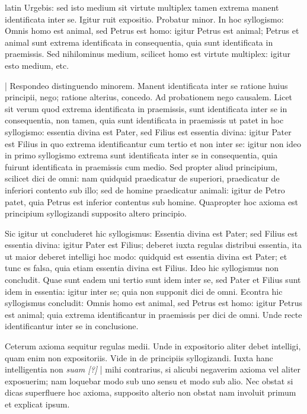 \begin{otherlanguage*}{latin}
\pstart
Urgebis:
sed isto medium sit virtute multiplex tamen extrema manent identificata inter se. Igitur ruit expositio. Probatur minor. In hoc syllogismo:
Omnis homo est animal, sed Petrus est homo:
igitur Petrus est animal; Petrus et animal sunt extrema identificata in consequentia, quia sunt identificata in praemissis. Sed nihilominus medium, scilicet homo est virtute multiplex:
igitur esto medium, etc. 
\pend

\pstart
\textnormal{|} Respondeo distinguendo minorem. Manent identificata inter se ratione huius principii, nego; ratione alterius, concedo. Ad probationem nego causalem. Licet sit verum quod extrema identificata in praemissis, sunt identificata inter se in consequentia, non tamen, quia sunt identificata in praemissis ut patet in hoc syllogismo:
essentia divina est Pater, sed Filius est essentia divina:
igitur Pater est Filius in quo extrema identificantur cum tertio et non inter se:
igitur non ideo in primo syllogismo extrema sunt identificata inter se in consequentia, quia fuirunt identificata in praemissis cum medio. Sed propter aliud principium, scilicet dici de omni:
nam quidquid praedicatur de superiori, praedicatur de inferiori contento sub illo; sed de homine praedicatur animali:
igitur de Petro patet, quia Petrus est inferior contentus sub homine. Quapropter hoc axioma est principium syllogizandi supposito altero principio. 
\pend

\pstart
Sic igitur ut concluderet hic syllogismus:
Essentia divina est Pater; sed Filius est essentia divina:
igitur Pater est Filius; deberet iuxta regulas distribui essentia, ita ut maior deberet intelligi hoc modo:
quidquid est essentia divina est Pater; et tunc es falsa, quia etiam essentia divina est Filius. Ideo hic syllogismus non concludit. Quae sunt eadem uni tertio sunt idem inter se, sed Pater et Filius sunt idem in essentia:
igitur inter se; quia non supponit dici de omni. Econtra hic syllogismus concludit:
Omnis homo est animal, sed Petrus est homo:
igitur Petrus est animal; quia extrema identificantur in praemissis per dici de omni. Unde recte identificantur inter se in conclusione. 
\pend

\pstart
Ceterum axioma sequitur regulas medii. Unde in expositorio aliter debet intelligi, quam enim non expositoriis. Vide in  de principiis syllogizandi. Iuxta hanc intelligentia non \emph{suam [?]} \textnormal{|} mihi contrarius, si alicubi negaverim axioma vel aliter exposuerim; nam loquebar modo sub uno sensu et modo sub alio. Nec obstat si dicas superfluere hoc axioma, supposito alterio non obstat nam involuit primum et explicat ipsum. 
\pend


\end{otherlanguage*}

